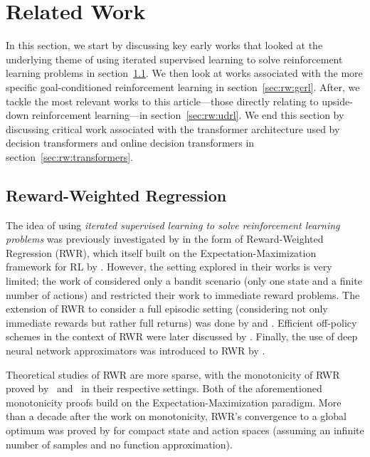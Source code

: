 \section{Related Work}
\label{se:relwork}




In this section, we start by discussing key early works that looked at the underlying theme of using iterated supervised learning to solve reinforcement learning problems in section~\ref{sec:rw:rwr}.
We then look at works associated with the more specific goal-conditioned reinforcement learning in section~\ref{sec:rw:gcrl}.
After, we tackle the most relevant works to this article---those directly relating to upside-down reinforcement learning---in section~\ref{sec:rw:udrl}.
We end this section by discussing critical work associated with the transformer architecture used by decision transformers and online decision transformers in section~\ref{sec:rw:transformers}.


\subsection{Reward-Weighted Regression}
\label{sec:rw:rwr}

The idea of using \emph{iterated supervised learning to solve reinforcement learning problems} was previously investigated by \citet{peters2007reinforcement} in the form of Reward-Weighted Regression (RWR),
which itself built on the Expectation-Maximization framework for RL by \citet{dayan1997using}.
However, the setting explored in their works is very limited; the work of \citet{dayan1997using} considered only a bandit scenario
(only one state and a finite number of actions) and
\citet{peters2007reinforcement} restricted their work to immediate reward
problems.
The extension of RWR to consider a full episodic setting (considering not only immediate rewards but rather full returns) was done by \citet{wierstra2008episodic}
and \citet{kober2011policy}.
Efficient off-policy schemes in the context of RWR were later discussed by \citet{hachiya2009efficient,hachiya2011reward}.
Finally, the use of deep neural network approximators was introduced to RWR by \citet{peng2019advantage}.

Theoretical studies of RWR are more sparse, with the monotonicity of RWR proved by~\citet{dayan1997using} and~\citet{peters2007reinforcement} in their respective settings. Both of the aforementioned monotonicity proofs build on the Expectation-Maximization paradigm.
More than a decade after the work on monotonicity, RWR's convergence to a global optimum was
proved by \citet{strupl2021reward} for compact state and action spaces (assuming an infinite number of samples and no function approximation).

